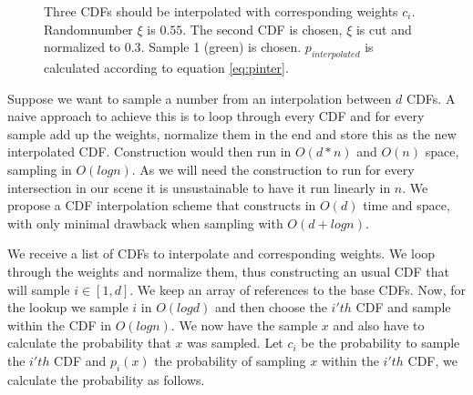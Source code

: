 \begin{figure}[htb]
    \caption{Three CDFs should be interpolated with corresponding weights $c_i$. Randomnumber $\xi$ is $0.55$. The second CDF is chosen, $\xi$ is cut and normalized to $0.3$. Sample 1 (green) is chosen. $p_{interpolated}$ is calculated according to equation \ref{eq:pinter}.} 
    \label{fig:interpolatedCDF}
\end{figure}

Suppose we want to sample a number from an interpolation between $d$ CDFs. A naive approach to achieve this is to loop through every CDF and for every sample add up the weights, normalize them in the end and store this as the new interpolated CDF. Construction would then run in $O(d * n)$ and $O(n)$ space, sampling in $O(logn)$. As we will need the construction to run for every intersection in our scene it is unsustainable to have it run linearly in $n$. We propose a CDF interpolation scheme that constructs in $O(d)$ time and space, with only minimal drawback when sampling with $O(d + logn)$.

We receive a list of CDFs to interpolate and corresponding weights. We loop through the weights and normalize them, thus constructing an usual CDF that will sample $i \in [1,d]$. We keep an array of references to the base CDFs. Now, for the lookup we sample $i$ in $O(logd)$ and then choose the $i'th$ CDF and sample within the CDF in $O(logn)$. We now have the sample $x$ and also have to calculate the probability that $x$ was sampled. Let $c_i$ be the probability to sample the $i'th$ CDF and $p_i(x)$ the probability of sampling $x$ within the $i'th$ CDF, we calculate the probability as follows.

